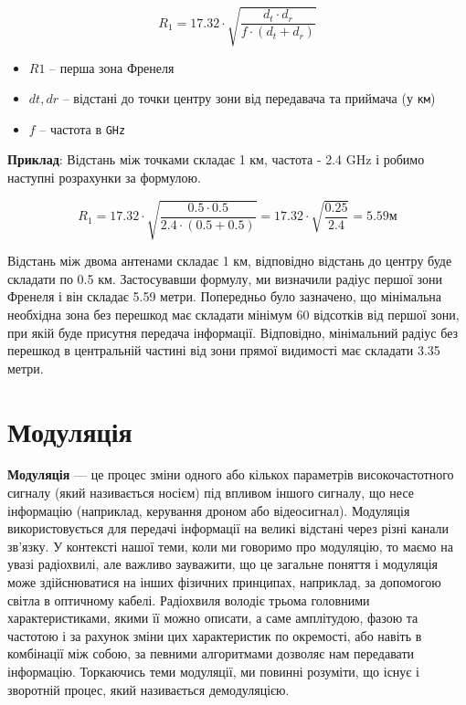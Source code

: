 \documentclass{article}
\begin{document}
\[
R_1 = 17.32 \cdot \sqrt{\frac{d_t \cdot d_r}{f \cdot (d_t + d_r)}}
\]

\begin{itemize}[noitemsep, topsep=8pt]
	\item $R1$ -- перша зона Френеля
	\item $dt,dr$ -- відстані до точки центру зони від передавача та приймача (у \texttt{км})
	\item ${f}$ -- частота в \texttt{GHz}
\end{itemize}

\textbf{Приклад}: Відстань між точками складає 1 км, частота - 2.4 GHz і робимо наступні розрахунки за формулою.

\[
R_1 = 17.32 \cdot \sqrt{\frac{0.5 \cdot 0.5}{2.4 \cdot (0.5 + 0.5)}}=17.32 \cdot \sqrt {\frac{0.25}{2.4}}=5.59 м
\]

Відстань між двома антенами складає 1 км, відповідно відстань до центру буде складати по 0.5 км. Застосувавши формулу, ми визначили радіус першої зони Френеля і він складає 5.59 метри. Попередньо було зазначено, що мінімальна необхідна зона без перешкод має складати мінімум 60 відсотків від першої зони, при якій буде присутня передача інформації. Відповідно, мінімальний радіус без перешкод в центральній частині від зони прямої видимості має складати 3.35 метри.


\section{Модуляція}
\label{sec:modulation}

\textbf{Модуляція} --- це процес зміни одного або кількох параметрів високочастотного сигналу (який називається носієм) під впливом іншого сигналу, що несе інформацію (наприклад, керування дроном або відеосигнал). Модуляція використовується для передачі інформації на великі відстані через різні канали зв'язку. У контексті нашої теми, коли ми говоримо про модуляцію, то маємо на увазі радіохвилі, але важливо зауважити, що це загальне поняття і модуляція може здійснюватися на інших фізичних принципах, наприклад, за допомогою світла в оптичному кабелі. Радіохвиля володіє трьома головними характеристиками, якими її можно описати, а саме амплітудою, фазою та частотою і за рахунок зміни цих характеристик по окремості, або навіть в комбінації між собою, за певними алгоритмами дозволяє нам передавати інформацію. Торкаючись теми модуляції, ми повинні розуміти, що існує і зворотній процес, який називається демодуляцією. 
\end{document}
